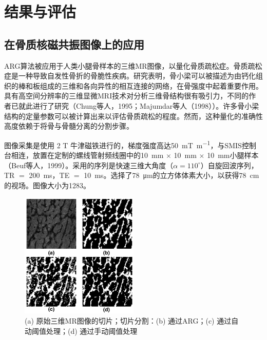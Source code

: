 \section{结果与评估}\label{sec:results_and_evaluation}

\subsection{在骨质核磁共振图像上的应用}
ARG算法被应用于人类小腿骨样本的三维MR图像，以量化骨质疏松症。骨质疏松症是一种导致自发性骨折的骨脆性疾病。研究表明，骨小梁可以被描述为由钙化组织的棒和板组成的三维和各向异性的相互连接的网络，在骨强度中起着重要作用。具有高空间分辨率的三维显微MRI技术对分析三维骨结构很有吸引力，不同的作者已就此进行了研究（Chung等人，1995\cite{chung1995threedimensional}；Majumdar等人（1998）\cite{majumdar1998high}）。许多骨小梁结构的定量参数可以被计算出来以评估骨质疏松的程度。然而，这种量化的准确性高度依赖于将骨与骨髓分离的分割步骤。

图像采集是使用 2 T 牛津磁铁进行的，梯度强度高达\SI[per-mode=fraction]{50}{\milli\tesla\per\meter}，与SMIS控制台相连，放置在定制的螺线管射频线圈中的\SI{10}{\milli\meter} $\times$ \SI{10}{\milli\meter} $\times$ \SI{10}{\milli\meter}小腿样本（Beuf等人，1999\cite{beuf1999high}）。采用的序列是快速三维大角度（$\alpha = 110^{\circ}$）自旋回波序列，TR $=$ \SI{200}{\milli\second}，TE $=$ \SI{10}{\milli\second}。选择了\SI{78}{\micro\meter}的立方体体素大小，以获得\SI{78}{\centi\meter}的视场。图像大小为\num{1283}。

\begin{figure}[htbp]
    \centering
    \includegraphics[width=0.5\textwidth]{figures/三维MR切片.png}
    \caption{(a) 原始三维MR图像的切片；切片分割：(b) 通过ARG；(c) 通过自动阈值处理；(d) 通过手动阈值处理}
    \label{fig:三维MR切片}
\end{figure}

